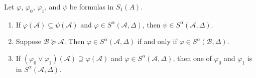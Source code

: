 \documentclass{article}
\let\mc\mathcal
\begin{document}
\begin{lemma}\label{pRank}
    Let $\varphi$, $\varphi_0$, $\varphi_1$, and $\psi$ be formulas in $S_1(A)$.
    \begin{enumerate}
        \item If $\varphi(\mc{A}) \subseteq \psi(\mc{A})$ and $\varphi \in S^{\alpha}(\mc{A}, \Delta)$, then $\psi \in S^{\alpha}(\mc{A}, \Delta)$.
        \item Suppose $\mc{B} \succeq \mc{A}$. Then $\varphi \in S^{\alpha}(\mc{A}, \Delta)$ if and only if $\varphi \in S^{\alpha}(\mc{B}, \Delta)$.
        \item If $(\varphi_0 \lor \varphi_1)(\mc{A}) \supseteq \varphi(\mc{A})$ and $\varphi \in S^{\alpha}(\mc{A}, \Delta)$, then one of $\varphi_0$ and $\varphi_1$ is in $S^{\alpha}(\mc{A}, \Delta)$.
    \end{enumerate}
\end{lemma}
\end{document}
